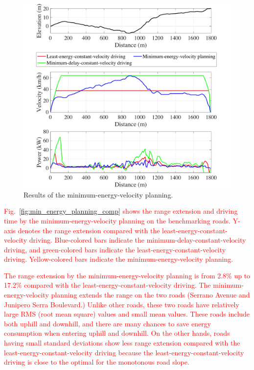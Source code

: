 \documentclass{IEEEtran}
\begin{document}
\begin{figure}[h] %
\centering
\includegraphics[width=\hsize]{Figures/energy_driving_profile_best.pdf}
\caption{Results of the minimum-energy-velocity planning.}
\label{fig:no_deadline_trace}
\end{figure} 

\textcolor{red}{Fig.~\ref{fig:min_energy_planning_comp} shows the range extension and driving time by the minimum-energy-velocity planning on the benchmarking roads. Y-axis denotes the range extension compared with the least-energy-constant-velocity driving. Blue-colored bars indicate the minimum-delay-constant-velocity driving, and green-colored bars indicate the least-energy-constant-velocity driving. Yellow-colored bars indicate the minimum-energy-velocity planning.}

\textcolor{red}{The range extension by the minimum-energy-velocity planning is from 2.8\% up to 17.2\% compared with the least-energy-constant-velocity driving. 
The minimum-energy-velocity planning extends the range on the two roads (Serrano Avenue and Junipero Serra Boulevard.) Unlike other roads, these two roads have relatively large RMS (root mean square) values and small mean values. These roads include both uphill and downhill, and there are many chances to save energy consumption when entering uphill and downhill.
On the other hands, roads having small standard deviations show less range extension compared with the least-energy-constant-velocity driving because the least-energy-constant-velocity driving is close to the optimal for the monotonous road slope.}
\end{document}
